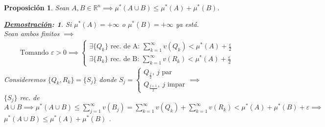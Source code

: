 \documentclass[10pt,a4paper,openright]{book}
\theoremstyle{break}
\newtheorem*{prop}{Proposición}
\newtheorem*{demo}{\underline{Demostración}:}
\begin{document}
\begin{prop}
   Sean $A, B \in \mathbb{R}^{n} \implies \mu^{*}\left( A \cup B \right) \le \mu^{*}\left( A \right) + \mu^{*}\left( B \right)  $.
   \begin{demo}
       Si $\mu^{*}\left( A \right) = +\infty$ o $\mu^{*}\left( B \right) = +\infty$ ya está. \\ 
       Sean ambos finitos $ \implies$ 
       \begin{align*}
       \text{Tomando } \varepsilon > 0 \implies
           \begin{cases}
               \exists \{Q_k\} \text{ rec. de A: } \sum_{k=1}^{\infty} v\left( Q_k \right) < \mu^{*}\left( A \right) + \frac{\varepsilon}{2}  \\
               \exists \{R_k\} \text{ rec. de B: } \sum_{k=1}^{\infty} v\left( R_k \right) < \mu^{*}\left( A \right) + \frac{\varepsilon}{2}  
           \end{cases}
       \end{align*}
       Consideremos $ \{Q_k, R_k\} = \{S_j\}$ donde $S_j = \begin{cases}
           Q_{\frac{j}{2}},\ j \text{ par} \\
           Q_{\frac{j+1}{2}},\ j \text{ impar} 
       \end{cases} \implies$\\
       $\{S_j\}$ rec. de $A\cup B \implies \mu^{*}\left( A\cup B \right) \le \sum_{j=1}^{\infty} v\left( B_j \right) = \sum_{k=1}^{\infty} v\left( Q_k \right) + \sum_{k=1}^{\infty} v\left( R_k \right) < \mu^{*}\left( A \right) + \mu^{*}\left( B \right) + \varepsilon  \implies$
       $\mu^{*}\left( A\cup B \right) \le \mu^{*}\left( A \right) + \mu^{*}\left( B \right)$
   .\end{demo}
\end{prop}
\end{document}
